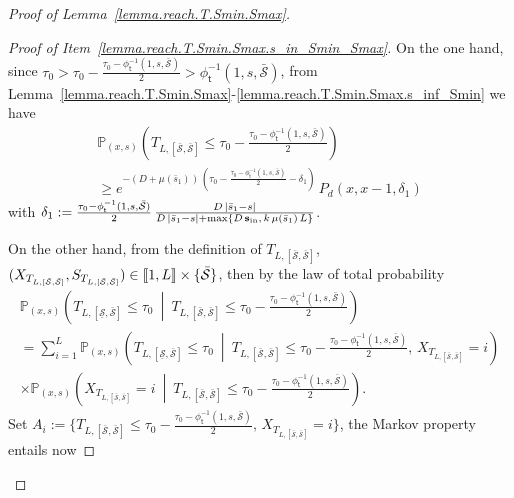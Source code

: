\documentclass[10pt]{amsart}
\theoremstyle{definition}\newtheorem{defi}[theo]{Definition}\newtheorem{rema}[theo]{Remark}\newtheorem{exam}[theo]{Example}\newtheorem{exem}[theo]{Example}\newtheorem{nota}[theo]{Notation}
\newcommand{\llbracket}{\mathopen{[\mkern -2.7mu[}}
\newcommand{\rrbracket}{\mathclose{]\mkern -2.7mu]}}
\newcommand{\PP}{\mathbb{P}}
\newcommand{\Sin}{{\mathbf s}_{\textrm{\tiny\rm in}}}
\newcommand{\Smin}{\underline{\mathcal{S}}}
\newcommand{\Smax}{\bar{\mathcal{S}}}
\newcommand{\barmu}{\mu(\bar s_1)}
\newcommand{\phit}{\phi_\textsf{t}^{-1}}
\newcommand{\1}{\mathbf{1}}
\begin{document}
\begin{proof}[Proof of Lemma~\ref{lemma.reach.T.Smin.Smax}]
\begin{proof}[{Proof of Item~\eqref{lemma.reach.T.Smin.Smax.s_in_Smin_Smax}}]
On the one hand, since $\tau_0>\tau_0-\frac{\tau_0-\phit(1, s,\Smax)}{2}>\phit(1, s,\Smax)$, from Lemma~\ref{lemma.reach.T.Smin.Smax}-\ref{lemma.reach.T.Smin.Smax.s_inf_Smin} we have
\begin{multline}\label{lemma.reachS.exit}
\PP_{(x,s)}\left(T_{L,[\Smax,\Smax]}\leq\tau_0-\frac{\tau_0-\phit\left(1, s,\Smax\right)}{2}\right)
\\ 
\geq e^{-(D+\barmu)\,\left(\tau_0-\frac{\tau_0-\phit\left(1, s,\Smax\right)}{2}-\delta_1\right)}\, P_d(x,x-1, \delta_1)
\end{multline}
with $\delta_1:=\frac{\tau_0-\phit(1, s,\Smax)}{2}\,\frac{D\,|\bar s_1-s|}{D\,|\bar s_1-s|+\max\{D\,\Sin,\,k\,\barmu\,L\}}$.


On the other hand, from the definition of $T_{L,[\Smax, \Smax]}$, $(X_{T_{L,[\Smax,\Smax]}},S_{T_{L,[\Smax,\Smax]}})\in \llbracket 1, L \rrbracket \times \{\Smax\}$, then by the law of total probability
\begin{multline*}
\PP_{(x,s)}\left(T_{L,[\Smin,\Smax]}\leq\tau_0\ \middle| \ T_{L,[\Smax,\Smax]}\leq \tau_0-\frac{\tau_0-\phit\left(1, s,\Smax\right)}{2} \right)
\\
=
\sum_{i=1}^L
\PP_{(x,s)}
\left(T_{L,[\Smin,\Smax]}\leq\tau_0 \ \middle| \ T_{L,[\Smax,\Smax]}\leq \tau_0-\frac{\tau_0-\phit\left(1, s,\Smax\right)}{2},\, X_{T_{L,[\Smax,\Smax]}}=i\right)
\\
\times
\PP_{(x,s)}
\left(X_{T_{L,[\Smax,\Smax]}}=i \ \middle| \ T_{L,[\Smax,\Smax]}\leq \tau_0-\frac{\tau_0-\phit\left(1, s,\Smax\right)}{2} \right).
\end{multline*}
Set $A_i:=\{ T_{L,[\Smax,\Smax]}\leq \tau_0-\frac{\tau_0-\phit(1, s,\Smax)}{2},\,X_{T_{L,[\Smax,\Smax]}}=i\}$, the Markov property entails now


\end{proof}
\end{proof}
\end{document}
